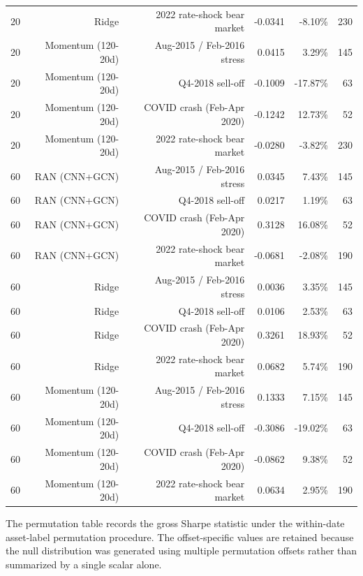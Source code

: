 \documentclass[10pt]{article}
\begin{document}
\begin{longtable}{lrrrrr}
20 & Ridge & 2022 rate-shock bear market & -0.0341 & -8.10\% & 230 \\
20 & Momentum (120-20d) & Aug-2015 / Feb-2016 stress & 0.0415 & 3.29\% & 145 \\
20 & Momentum (120-20d) & Q4-2018 sell-off & -0.1009 & -17.87\% & 63 \\
20 & Momentum (120-20d) & COVID crash (Feb-Apr 2020) & -0.1242 & 12.73\% & 52 \\
20 & Momentum (120-20d) & 2022 rate-shock bear market & -0.0280 & -3.82\% & 230 \\
60 & RAN (CNN+GCN) & Aug-2015 / Feb-2016 stress & 0.0345 & 7.43\% & 145 \\
60 & RAN (CNN+GCN) & Q4-2018 sell-off & 0.0217 & 1.19\% & 63 \\
60 & RAN (CNN+GCN) & COVID crash (Feb-Apr 2020) & 0.3128 & 16.08\% & 52 \\
60 & RAN (CNN+GCN) & 2022 rate-shock bear market & -0.0681 & -2.08\% & 190 \\
60 & Ridge & Aug-2015 / Feb-2016 stress & 0.0036 & 3.35\% & 145 \\
60 & Ridge & Q4-2018 sell-off & 0.0106 & 2.53\% & 63 \\
60 & Ridge & COVID crash (Feb-Apr 2020) & 0.3261 & 18.93\% & 52 \\
60 & Ridge & 2022 rate-shock bear market & 0.0682 & 5.74\% & 190 \\
60 & Momentum (120-20d) & Aug-2015 / Feb-2016 stress & 0.1333 & 7.15\% & 145 \\
60 & Momentum (120-20d) & Q4-2018 sell-off & -0.3086 & -19.02\% & 63 \\
60 & Momentum (120-20d) & COVID crash (Feb-Apr 2020) & -0.0862 & 9.38\% & 52 \\
60 & Momentum (120-20d) & 2022 rate-shock bear market & 0.0634 & 2.95\% & 190 \\
\bottomrule
\end{longtable}
\endgroup

The permutation table records the gross Sharpe statistic under the within-date asset-label permutation procedure. The offset-specific values are retained because the null distribution was generated using multiple permutation offsets rather than summarized by a single scalar alone.
\end{document}
